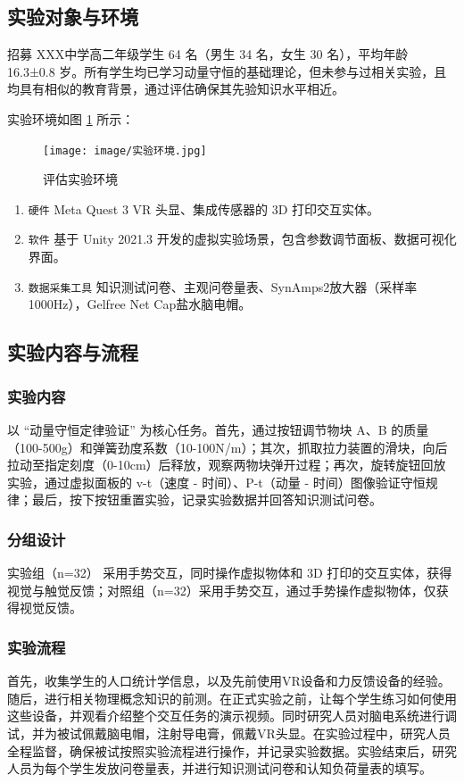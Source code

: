 \documentclass[runningheads]{llncs}
\begin{document}
\subsection{实验对象与环境}

招募
XXX中学高二年级学生 64 名（男生 34 名，女生 30 名），平均年龄 16.3±0.8 岁。所有学生均已学习动量守恒的基础理论，但未参与过相关实验，且均具有相似的教育背景，通过评估确保其先验知识水平相近。

实验环境如图
 \ref{fig1}
所示：

\begin{figure}
\texttt{[image: image/实验环境.jpg]}
	\caption{评估实验环境}\label{fig1}
\end{figure}

\begin{enumerate}[label={$\bullet$}]
  \item \texttt{硬件} Meta Quest 3 VR 头显、集成传感器的 3D 打印交互实体。
  \item \texttt{软件} 基于 Unity 2021.3 开发的虚拟实验场景，包含参数调节面板、数据可视化界面。
  \item \texttt{数据采集工具} 知识测试问卷、主观问卷量表、SynAmps2放大器（采样率1000Hz），Gelfree Net Cap盐水脑电帽。
\end{enumerate}

\subsection{实验内容与流程}
\subsubsection{实验内容}
以 “动量守恒定律验证” 为核心任务。首先，通过按钮调节物块 A、B 的质量（100-500g）和弹簧劲度系数（10-100N/m）；其次，抓取拉力装置的滑块，向后拉动至指定刻度（0-10cm）后释放，观察两物块弹开过程；再次，旋转旋钮回放实验，通过虚拟面板的 v-t（速度 - 时间）、P-t（动量 - 时间）图像验证守恒规律；最后，按下按钮重置实验，记录实验数据并回答知识测试问卷。

\subsubsection{分组设计} 实验组（n=32） 采用手势交互，同时操作虚拟物体和 3D 打印的交互实体，获得视觉与触觉反馈；对照组（n=32）采用手势交互，通过手势操作虚拟物体，仅获得视觉反馈。

\subsubsection{实验流程}
首先，收集学生的人口统计学信息，以及先前使用VR设备和力反馈设备的经验。随后，进行相关物理概念知识的前测。在正式实验之前，让每个学生练习如何使用这些设备，并观看介绍整个交互任务的演示视频。同时研究人员对脑电系统进行调试，并为被试佩戴脑电帽，注射导电膏，佩戴VR头显。在实验过程中，研究人员全程监督，确保被试按照实验流程进行操作，并记录实验数据。实验结束后，研究人员为每个学生发放问卷量表，并进行知识测试问卷和认知负荷量表的填写。
\end{document}
